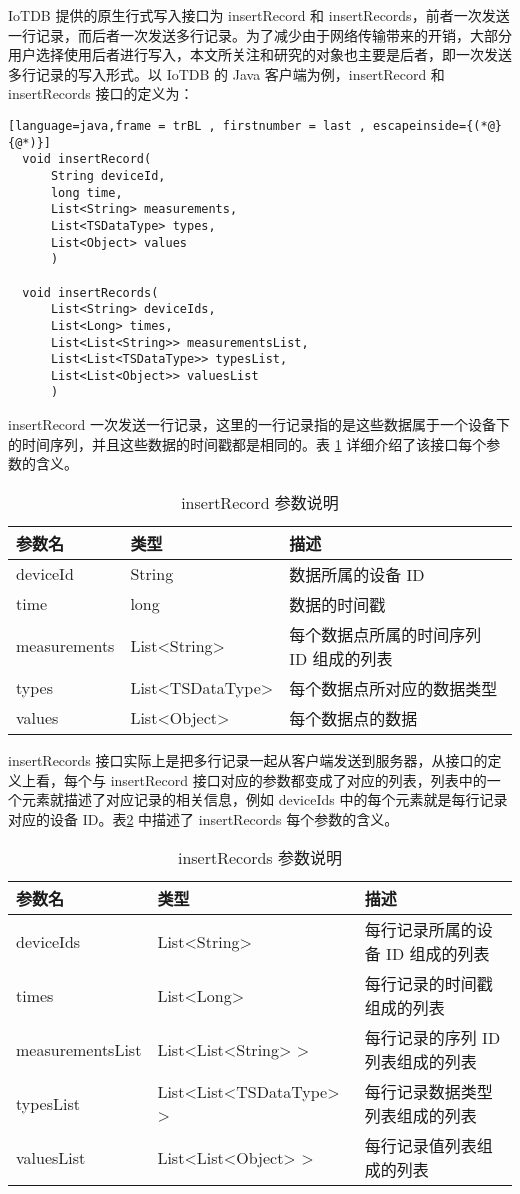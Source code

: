 IoTDB 提供的原生行式写入接口为 insertRecord 和 insertRecords，前者一次发送一行记录，而后者一次发送多行记录。为了减少由于网络传输带来的开销，大部分用户选择使用后者进行写入，本文所关注和研究的对象也主要是后者，即一次发送多行记录的写入形式。以 IoTDB 的 Java 客户端为例，insertRecord 和 insertRecords 接口的定义为：
\begin{lstlisting}[language=java,frame = trBL , firstnumber = last , escapeinside={(*@}{@*)}]
  void insertRecord(
      String deviceId,
      long time,
      List<String> measurements,
      List<TSDataType> types,
      List<Object> values
      )

  void insertRecords(
      List<String> deviceIds, 
      List<Long> times, 
      List<List<String>> measurementsList, 
      List<List<TSDataType>> typesList, 
      List<List<Object>> valuesList
      )
\end{lstlisting}
insertRecord 一次发送一行记录，这里的一行记录指的是这些数据属于一个设备下的时间序列，并且这些数据的时间戳都是相同的。表 \ref{tabular:insert-record-params} 详细介绍了该接口每个参数的含义。
\begin{table}
  \centering
  \caption{insertRecord 参数说明}
  \begin{tabular}{lll}
    \toprule
    参数名 &  类型 & 描述 \\
    \midrule
    deviceId & String & 数据所属的设备 ID \\
    time & long & 数据的时间戳 \\
    measurements & List<String> & 每个数据点所属的时间序列 ID 组成的列表 \\
    types & List<TSDataType> & 每个数据点所对应的数据类型 \\
    values & List<Object> & 每个数据点的数据 \\
    \bottomrule
  \end{tabular}
  \label{tabular:insert-record-params}
\end{table}

insertRecords 接口实际上是把多行记录一起从客户端发送到服务器，从接口的定义上看，每个与 insertRecord 接口对应的参数都变成了对应的列表，列表中的一个元素就描述了对应记录的相关信息，例如 deviceIds 中的每个元素就是每行记录对应的设备 ID。表\ref{tabular:insert-records-params} 中描述了 insertRecords 每个参数的含义。

\begin{table}
  \centering
  \caption{insertRecords 参数说明}
  \begin{tabular}{lll}
    \toprule
    参数名 &  类型 & 描述 \\
    \midrule
    deviceIds & List<String> & 每行记录所属的设备 ID 组成的列表 \\
     times & List<Long> & 每行记录的时间戳组成的列表 \\
    measurementsList & List<List<String> > & 每行记录的序列 ID 列表组成的列表 \\
    typesList & List<List<TSDataType> > & 每行记录数据类型列表组成的列表 \\
    valuesList & List<List<Object> > & 每行记录值列表组成的列表 \\
    \bottomrule
  \end{tabular}
  \label{tabular:insert-records-params}
\end{table}

